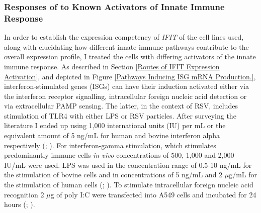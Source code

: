 \subsubsection{Responses of to Known Activators of Innate Immune Response} \label{Responses to Known Activators of Innate Immune Response}
In order to establish the expression competency of \textit{IFIT} of the cell lines used, along with elucidating how different innate immune pathways contribute to the overall expression profile, I treated the cells with differing activators of the innate immune response. As described in Section \ref{Routes of IFIT Expression Activation}, and depicted in Figure \ref{Pathways Inducing ISG mRNA Production.},  interferon-stimulated genes (ISGs) can have their induction activated either via the interferon receptor signalling, intracellular foreign nucleic acid detection or via extracellular PAMP sensing. The latter, in the context of RSV, includes stimulation of TLR4 with either LPS or RSV particles. After surveying the literature I ended up using 1,000 international units (IU) per mL or the equivalent amount of 5 ng/mL for human and bovine interferon alpha respectively (\cite{Terenzi2006DistinctISG56}; \cite{Santhakumar2018ChickenViruses}). For interferon-gamma stimulation, which stimulates predominantly immune cells \textit{in vivo} concentrations of 500, 1,000 and 2,000 IU/mL were used. LPS was used in the concentration range of 0.5-10 ng/mL for the stimulation of bovine cells and in concentrations of 5 ng/mL and 2 \(\mu\)g/mL for the stimulation of human cells (\cite{Mears2019Ifit1Cells}; \cite{Zhang2019GrouperResponse}). To stimulate intracellular foreign nucleic acid recognition 2 \(\mu\)g of poly I:C were transfected into A549 cells and incubated for 24 hours (\cite{Mears2019Ifit1Cells}; \cite{Palchetti2015TransfectedCells}).

